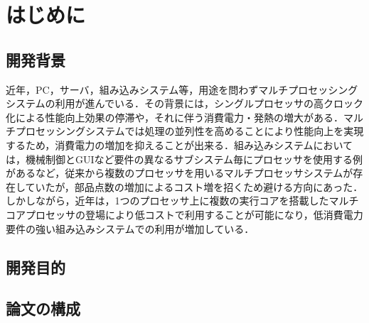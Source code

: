 \chapter{はじめに}

\section{開発背景}
近年，PC，サーバ，組み込みシステム等，用途を問わずマルチプロセッシングシステムの利用が進んでいる．その背景には，シングルプロセッサの高クロック化による性能向上効果の停滞や，それに伴う消費電力・発熱の増大がある．マルチプロセッシングシステムでは処理の並列性を高めることにより性能向上を実現するため，消費電力の増加を抑えることが出来る．組み込みシステムにおいては，機械制御とGUIなど要件の異なるサブシステム毎にプロセッサを使用する例があるなど，従来から複数のプロセッサを用いるマルチプロセッサシステムが存在していたが，部品点数の増加によるコスト増を招くため避ける方向にあった．しかしながら，近年は，1つのプロセッサ上に複数の実行コアを搭載したマルチコアプロセッサの登場により低コストで利用することが可能になり，低消費電力要件の強い組み込みシステムでの利用が増加している．

\section{開発目的}

\section{論文の構成}
